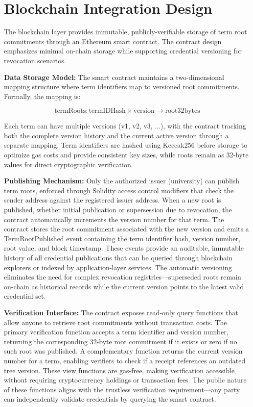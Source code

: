 \section{Blockchain Integration Design}
\label{sec:blockchain-design}

The blockchain layer provides immutable, publicly-verifiable storage of term root commitments through an Ethereum smart contract. The contract design emphasizes minimal on-chain storage while supporting credential versioning for revocation scenarios.

\textbf{Data Storage Model:} The smart contract maintains a two-dimensional mapping structure where term identifiers map to versioned root commitments. Formally, the mapping is:

\begin{equation}
\text{termRoots}: \text{termIDHash} \times \text{version} \rightarrow \text{root32bytes}
\end{equation}

Each term can have multiple versions (v1, v2, v3, ...), with the contract tracking both the complete version history and the current active version through a separate mapping. Term identifiers are hashed using Keccak256 before storage to optimize gas costs and provide consistent key sizes, while roots remain as 32-byte values for direct cryptographic verification.

\textbf{Publishing Mechanism:} Only the authorized issuer (university) can publish term roots, enforced through Solidity access control modifiers that check the sender address against the registered issuer address. When a new root is published, whether initial publication or supersession due to revocation, the contract automatically increments the version number for that term. The contract stores the root commitment associated with the new version and emits a TermRootPublished event containing the term identifier hash, version number, root value, and block timestamp. These events provide an auditable, immutable history of all credential publications that can be queried through blockchain explorers or indexed by application-layer services. The automatic versioning eliminates the need for complex revocation registries—superseded roots remain on-chain as historical records while the current version points to the latest valid credential set.

\textbf{Verification Interface:} The contract exposes read-only query functions that allow anyone to retrieve root commitments without transaction costs. The primary verification function accepts a term identifier and version number, returning the corresponding 32-byte root commitment if it exists or zero if no such root was published. A complementary function returns the current version number for a term, enabling verifiers to check if a receipt references an outdated tree version. These view functions are gas-free, making verification accessible without requiring cryptocurrency holdings or transaction fees. The public nature of these functions aligns with the trustless verification requirement—any party can independently validate credentials by querying the smart contract.

